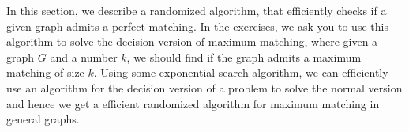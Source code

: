 In this section, we describe a randomized algorithm, that efficiently checks if a given graph admits a perfect matching. In the exercises, we ask you to use this algorithm to solve the decision version of maximum matching, where given a graph $G$ and a number $k$, we should find if the graph admits a maximum matching of size $k$. Using some exponential search algorithm, we can efficiently use an algorithm for the decision version of a problem to solve the normal version and hence we get a efficient randomized algorithm for maximum matching in general graphs.


